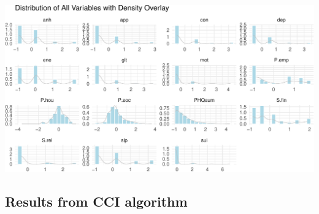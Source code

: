 \documentclass[
]{article}
\begin{document}
\begin{center}
\includegraphics{draft_v3_files/figure-pdf/unnamed-chunk-22-1.pdf}
\end{center}

\subsection{Results from CCI algorithm}\label{sec-cci}
\end{document}

